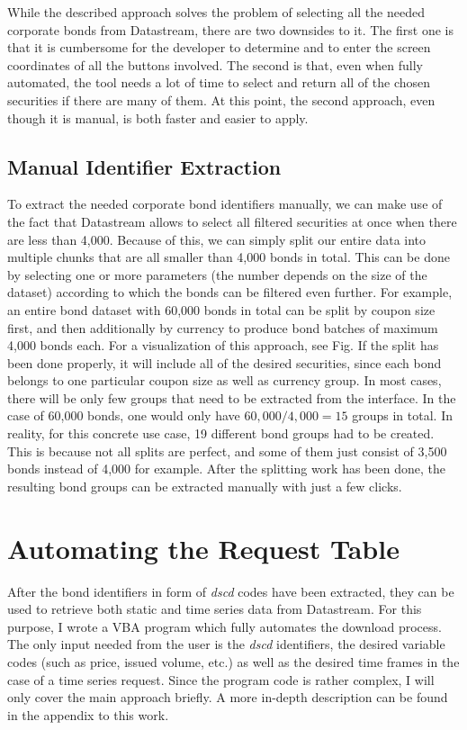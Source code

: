 While the described approach solves the problem of selecting all the needed corporate bonds from Datastream, there are two downsides to it. The first one is that it is cumbersome for the developer to determine and to enter the screen coordinates of all the buttons involved. The second is that, even when fully automated, the tool needs a lot of time to select and return all of the chosen securities if there are many of them. At this point, the second approach, even though it is manual, is both faster and easier to apply. 

\subsection{Manual Identifier Extraction}
To extract the needed corporate bond identifiers manually, we can make use of the fact that Datastream allows to select all filtered securities at once when there are less than 4,000. Because of this, we can simply split our entire data into multiple chunks that are all smaller than 4,000 bonds in total. This can be done by selecting one or more parameters (the number depends on the size of the dataset) according to which the bonds can be filtered even further. For example, an entire bond dataset with 60,000 bonds in total can be split by coupon size first, and then additionally by currency to produce bond batches of maximum 4,000 bonds each. For a visualization of this approach, see Fig. %
If the split has been done properly, it will include all of the desired securities, since each bond belongs to one particular coupon size as well as currency group. In most cases, there will be only few groups that need to be extracted from the interface. In the case of 60,000 bonds, one would only have $60,000 / 4,000 = 15$ groups in total. In reality, for this concrete use case, 19 different bond groups had to be created. This is because not all splits are perfect, and some of them just consist of 3,500 bonds instead of 4,000 for example. After the splitting work has been done, the resulting bond groups can be extracted manually with just a few clicks. 

\section{Automating the Request Table} \label{section:automating-request-table}
After the bond identifiers in form of \textit{dscd} codes have been extracted, they can be used to retrieve both static and time series data from Datastream. For this purpose, I wrote a VBA program which fully automates the download process. The only input needed from the user is the \textit{dscd }identifiers, the desired variable codes (such as price, issued volume, etc.) as well as the desired time frames in the case of a time series request. Since the program code is rather complex, I will only cover the main approach briefly. A more in-depth description can be found in the appendix to this work. %

